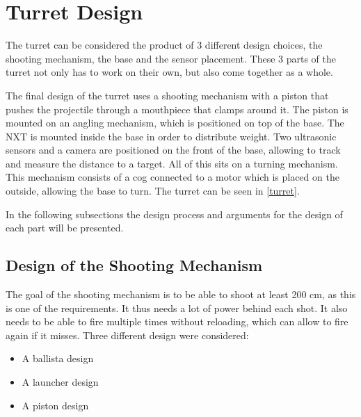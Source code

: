 \section{Turret Design}
The turret can be considered the product of 3 different design choices, the
shooting mechanism, the base and the sensor placement. These 3 parts of the
turret not only has to work on their own, but also come together as a whole.\nl

The final design of the turret uses a shooting mechanism with a piston
that pushes the projectile through a mouthpiece that clamps around it. The
piston is mounted on an angling mechanism, which is positioned on top of
the base. The NXT is mounted inside the base in order to distribute weight. Two
ultrasonic sensors and a camera are positioned on the front of the base,
allowing \name to track and measure the distance to a target. All of this sits
on a turning mechanism. This mechanism consists of a cog connected to a motor
which is placed on the outside, allowing the base to turn. The turret can be
seen in \autoref{turret}. 


In the following subsections the design process and arguments for the
design of each part will be presented.

\subsection{Design of the Shooting Mechanism}
The goal of the shooting mechanism is to be able to shoot at least
200 cm, as this is one of the requirements. It thus needs a lot of power behind
each shot. It also needs to be able to fire multiple times without reloading,
which can allow to fire again if it misses. Three different design were
considered:

\begin{itemize}
  \item A ballista design
  \item A launcher design
  \item A piston design
\end{itemize}

\begin{figure}[H]
\begin{minipage}{.31\textwidth}
\end{minipage}
\begin{minipage}{.29\linewidth}
\end{minipage}
\begin{minipage}{.29\linewidth}
\end{minipage}
\end{figure}

